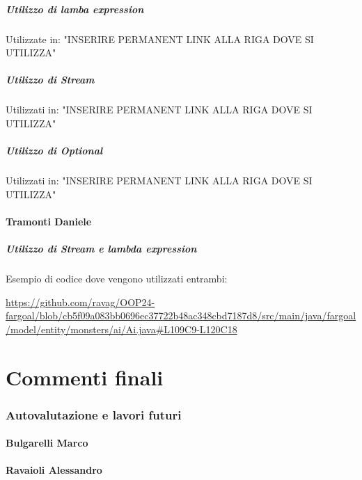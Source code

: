 \documentclass{report}
\begin{document}
\paragraph{Utilizzo di lamba expression}
Utilizzate in: "INSERIRE PERMANENT LINK ALLA RIGA DOVE SI UTILIZZA"

\paragraph{Utilizzo di Stream}
Utilizzati in: "INSERIRE PERMANENT LINK ALLA RIGA DOVE SI UTILIZZA"

\paragraph{Utilizzo di Optional}
Utilizzati in: "INSERIRE PERMANENT LINK ALLA RIGA DOVE SI UTILIZZA"

\subsubsection{Tramonti Daniele}
\paragraph{Utilizzo di Stream e lambda expression}
Esempio di codice dove vengono utilizzati entrambi:
\begin{sloppypar}
\url{https://github.com/ravag/OOP24-fargoal/blob/cb5f09a083bb0696ec37722b48ac348cbd7187d8/src/main/java/fargoal/model/entity/monsters/ai/Ai.java#L109C9-L120C18}
\end{sloppypar}

\chapter{Commenti finali}

\subsection{Autovalutazione e lavori futuri}

\subsubsection{Bulgarelli Marco}

\subsubsection{Ravaioli Alessandro}
\end{document}
